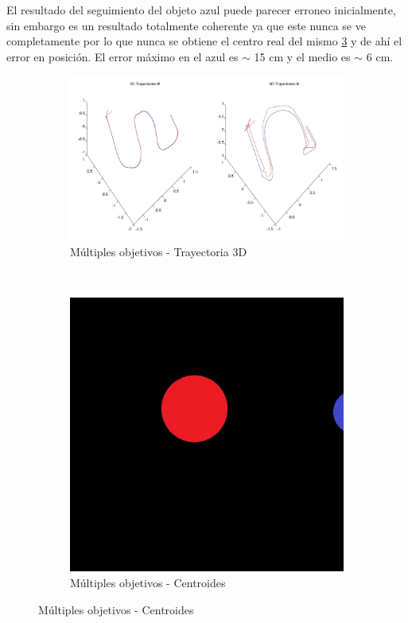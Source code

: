 	El resultado del seguimiento del objeto azul puede parecer erroneo inicialmente, sin embargo es un resultado totalmente coherente ya que este nunca se ve completamente por lo que nunca se obtiene el centro real del mismo \ref{fig:sim4_centroid_objs} y de ah\'i el error en posici\'on. El error m\'aximo en el azul es $\sim$ 15 cm y el medio es $\sim$ 6 cm.



\begin{figure}[hp]
	\centering
	\begin{subfigure}{0.45\linewidth}
		\centering
		\includegraphics[width=\linewidth]{../Images/c3/sim4_3dtraj}
		\caption{M\'ultiples objetivos - Trayectoria 3D}
		\label{fig:sim4_3dtraj}
	\end{subfigure}
	~
	\begin{subfigure}{0.2\linewidth}
		\centering
		\includegraphics[width=\linewidth]{../Images/c3/sims_two_object_centroid_out}
		\caption{M\'ultiples objetivos - Centroides}
		\label{fig:sim4_centroid_objs}
	\end{subfigure}
\end{figure}